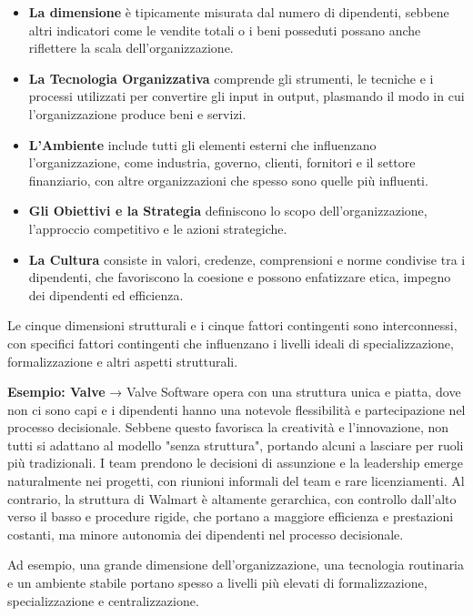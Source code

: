 \documentclass{article}
\begin{document}
    \begin{itemize}
        \item \textbf{La dimensione} è tipicamente misurata dal numero di dipendenti, sebbene altri indicatori come le vendite totali o i beni posseduti possano anche riflettere la scala dell'organizzazione.
        \item \textbf{La Tecnologia Organizzativa} comprende gli strumenti, le tecniche e i processi utilizzati per convertire gli input in output, plasmando il modo in cui l'organizzazione produce beni e servizi.
        \item \textbf{L'Ambiente} include tutti gli elementi esterni che influenzano l'organizzazione, come industria, governo, clienti, fornitori e il settore finanziario, con altre organizzazioni che spesso sono quelle più influenti.
        \item \textbf{Gli Obiettivi e la Strategia} definiscono lo scopo dell'organizzazione, l'approccio competitivo e le azioni strategiche.
        \item \textbf{La Cultura} consiste in valori, credenze, comprensioni e norme condivise tra i dipendenti, che favoriscono la coesione e possono enfatizzare etica, impegno dei dipendenti ed efficienza.
    \end{itemize}
    
    Le cinque dimensioni strutturali e i cinque fattori contingenti sono interconnessi, con specifici fattori contingenti che influenzano i livelli ideali di specializzazione, formalizzazione e altri aspetti strutturali.
    
    \textbf{Esempio: Valve} → Valve Software opera con una struttura unica e piatta, dove non ci sono capi e i dipendenti hanno una notevole flessibilità e partecipazione nel processo decisionale. Sebbene questo favorisca la creatività e l'innovazione, non tutti si adattano al modello "senza struttura", portando alcuni a lasciare per ruoli più tradizionali. I team prendono le decisioni di assunzione e la leadership emerge naturalmente nei progetti, con riunioni informali del team e rare licenziamenti. Al contrario, la struttura di Walmart è altamente gerarchica, con controllo dall'alto verso il basso e procedure rigide, che portano a maggiore efficienza e prestazioni costanti, ma minore autonomia dei dipendenti nel processo decisionale.
    
    Ad esempio, una grande dimensione dell'organizzazione, una tecnologia routinaria e un ambiente stabile portano spesso a livelli più elevati di formalizzazione, specializzazione e centralizzazione.
    
\end{document}
